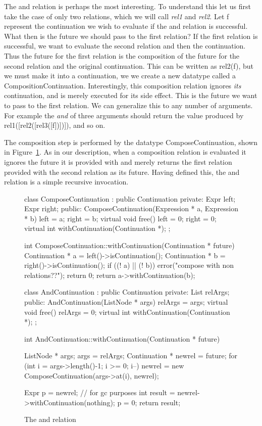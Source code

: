 The {\sf and} relation is perhaps the most interesting.  To understand this
let us first take the case of only two relations, which we will call {\em
rel1} and {\em rel2}.  Let {\sf f} represent the continuation 
we wish to evaluate if the {\sf and} relation is successful.  What then is
the future we should pass to the first relation?  If the first relation is
successful, we want to evaluate the second relation and then the
continuation.  Thus the future for the first relation is the composition of
the future for the second relation and the original continuation.
This can be written as {\sf rel2(f)}, but we must make it into a
continuation, we we create a new datatype called a {\sf
CompositionContinuation}.  Interestingly, this composition relation ignores
{\em its} continuation, and is merely executed for its side effect.
This is the future we want to pass to the first relation.  
We can generalize this to any number of arguments.  For example the {\em and} 
of three arguments should return the value produced by
{\sf rel1([rel2([rel3([f])])])}, and so on.

The composition step is performed by the datatype {\sf ComposeContinuation},
shown in Figure~\ref{composerel}.  As in our description, when a
composition relation is evaluated it ignores the future it is provided with
and merely returns the first relation provided with the second relation as
its future.  Having defined this, the {\sf and} relation is a simple recursive
invocation.

\begin{figure}
\begin{cprog}
class ComposeContinuation : public Continuation {
private:
	Expr left;
	Expr right;
public:
	ComposeContinuation(Expression * a, Expression * b)
		{ left = a; right = b; }
	virtual void free()
		{ left = 0; right = 0; }
	virtual int withContinuation(Continuation *);
};

int ComposeContinuation::withContinuation(Continuation * future)
{
	Continuation * a = left()->isContinuation();
	Continuation * b = right()->isContinuation();
	if ((! a) || (! b)) {
		error("compose with non relations??");
		return 0;
		}
	return a->withContinuation(b);
}

class AndContinuation : public Continuation {
private:
	List relArgs;
public:
	AndContinuation(ListNode * args)
		{ relArgs = args; }
	virtual void free()
		{ relArgs = 0; }
	virtual int withContinuation(Continuation *);
};

int AndContinuation::withContinuation(Continuation * future)
{
	ListNode * args;
	args = relArgs;
	Continuation * newrel = future;
	for (int i = args->length()-1; i >= 0; i--) 
		newrel = new ComposeContinuation(args->at(i), newrel);

	Expr p = newrel;	// for gc purposes
	int result = newrel->withContinuation(nothing);
	p = 0;
	return result;
}
\end{cprog}
\caption{The and relation}\label{composerel}
\end{figure}


